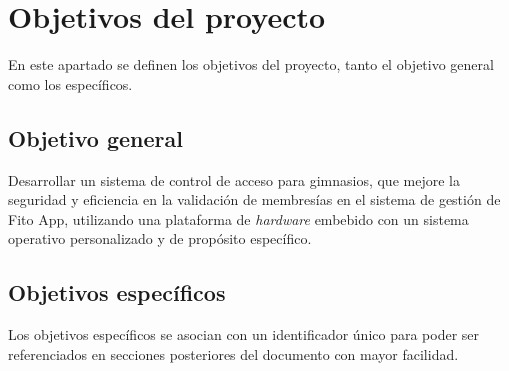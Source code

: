 \newpage
\section{Objetivos del proyecto}
En este apartado se definen los objetivos del proyecto, tanto el objetivo general como los específicos. 




\subsection{Objetivo general}
Desarrollar un sistema de control de acceso para gimnasios, que mejore la seguridad y eficiencia en la validación de membresías en el sistema de gestión de Fito App, utilizando una plataforma de \textit{hardware} embebido con un sistema operativo personalizado y de propósito específico. %


\subsection{Objetivos específicos}\label{secc:objectives}
Los objetivos específicos se asocian con un identificador único para poder ser referenciados en secciones posteriores del documento con mayor facilidad.

